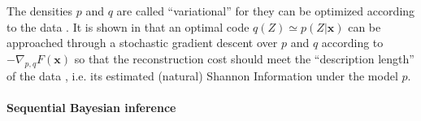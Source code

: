 \documentclass{article}
\begin{document}
The densities $p$ and $q$ are called ``variational'' for they can be optimized according to the data \citep{hinton2006fast,kingma2013auto}.  
It is shown in \cite{kingma2013auto} that an optimal code $q(Z)\simeq p(Z|\boldsymbol{x})$ can be approached through a stochastic gradient descent over $p$ and $q$ according to $-\nabla_{p,q} F(\boldsymbol{x}) $	so that the reconstruction cost should meet the ``description length'' of the data \citep{hinton1994autoencoders}, i.e. its estimated (natural) Shannon Information under the model $p$.


\paragraph{Sequential Bayesian inference}
\end{document}
